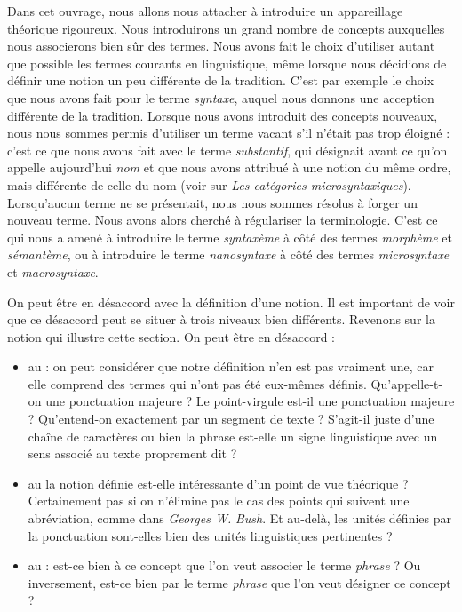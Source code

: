 {    Dans cet ouvrage, nous allons nous attacher à introduire un appareillage théorique rigoureux. Nous introduirons un grand nombre de concepts auxquelles nous associerons bien sûr des termes. Nous avons fait le choix d’utiliser autant que possible les termes courants en linguistique, même lorsque nous décidions de définir une notion un peu différente de la tradition. C’est par exemple le choix que nous avons fait pour le terme \textit{syntaxe}, auquel nous donnons une acception différente de la tradition. Lorsque nous avons introduit des concepts nouveaux, nous nous sommes permis d’utiliser un terme vacant s’il n’était pas trop éloigné : c’est ce que nous avons fait avec le terme \textit{substantif}, qui désignait avant ce qu’on appelle aujourd’hui \textit{nom} et que nous avons attribué à une notion du même ordre, mais différente de celle du nom (voir  sur \textit{Les catégories microsyntaxiques}). Lorsqu’aucun terme ne se présentait, nous nous sommes résolus à forger un nouveau terme. Nous avons alors cherché à régulariser la terminologie. C’est ce qui nous a amené à introduire le terme \textit{syntaxème} à côté des termes \textit{morphème} et \textit{sémantème}, ou à introduire le terme \textit{nanosyntaxe} à côté des termes \textit{microsyntaxe} et \textit{macrosyntaxe}.

    On peut être en désaccord avec la définition d’une notion. Il est important de voir que ce désaccord peut se situer à trois niveaux bien différents. Revenons sur la notion qui illustre cette section. On peut être en désaccord :

    \begin{itemize}
    \item  au  : on peut considérer que notre définition n’en est pas vraiment une, car elle comprend des termes qui n’ont pas été eux-mêmes définis. Qu’appelle-t-on une ponctuation majeure ? Le point-virgule est-il une ponctuation majeure ? Qu’entend-on exactement par un segment de texte ? S’agit-il juste d’une chaîne de caractères ou bien la phrase est-elle un signe linguistique avec un sens associé au texte proprement dit ?
    \item  au  la notion définie est-elle intéressante d’un point de vue théorique ? Certainement pas si on n’élimine pas le cas des points qui suivent une abréviation, comme dans \textit{Georges W.} \textit{Bush}. Et au-delà, les unités définies par la ponctuation sont-elles bien des unités linguistiques pertinentes ?
    \item  au  : est-ce bien à ce concept que l’on veut associer le terme \textit{phrase} ? Ou inversement, est-ce bien par le terme \textit{phrase} que l’on veut désigner ce concept ?
    \end{itemize}

}

